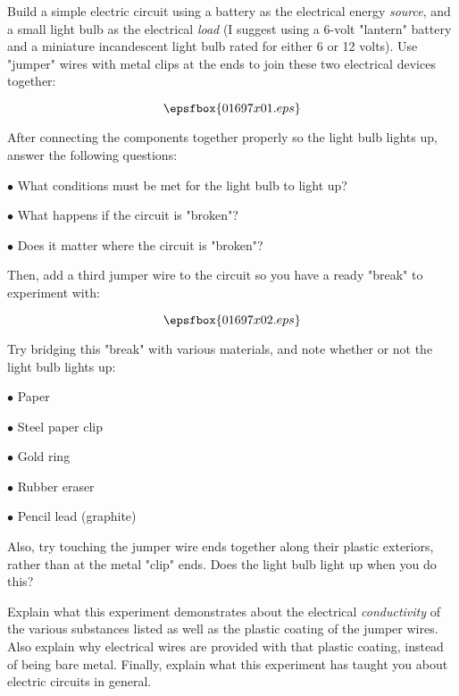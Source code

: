 

Build a simple electric circuit using a battery as the electrical energy {\it source}, and a small light bulb as the electrical {\it load} (I suggest using a 6-volt "lantern" battery and a miniature incandescent light bulb rated for either 6 or 12 volts).  Use "jumper" wires with metal clips at the ends to join these two electrical devices together:

$$\epsfbox{01697x01.eps}$$

After connecting the components together properly so the light bulb lights up, answer the following questions:

\medskip
\item{$\bullet$} What conditions must be met for the light bulb to light up?
\item{$\bullet$} What happens if the circuit is "broken"?
\item{$\bullet$} Does it matter where the circuit is "broken"?
\medskip

Then, add a third jumper wire to the circuit so you have a ready "break" to experiment with:

$$\epsfbox{01697x02.eps}$$

Try bridging this "break" with various materials, and note whether or not the light bulb lights up:

\medskip
\item{$\bullet$} Paper
\item{$\bullet$} Steel paper clip
\item{$\bullet$} Gold ring
\item{$\bullet$} Rubber eraser
\item{$\bullet$} Pencil lead (graphite)
\medskip

Also, try touching the jumper wire ends together along their plastic exteriors, rather than at the metal "clip" ends.  Does the light bulb light up when you do this?

\vskip 10pt

Explain what this experiment demonstrates about the electrical {\it conductivity} of the various substances listed as well as the plastic coating of the jumper wires.  Also explain why electrical wires are provided with that plastic coating, instead of being bare metal.  Finally, explain what this experiment has taught you about electric circuits in general.

